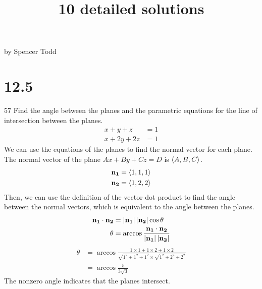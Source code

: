 \documentclass[12pt]{article}
\begin{document}
\title{10 detailed solutions}{by Spencer Todd}
\section{12.5}{57}
Find the angle between the planes and the parametric equations for the line of intersection between the planes.
%
\begin{align*}
x+y+z&=1\\
x+2y+2z&=1
\end{align*}
%
We can use the equations of the planes to find the normal vector for each plane. The normal vector of the
plane $Ax+By+Cz=D$ is $\left\langle{A,B,C}\right\rangle$.
%
\begin{align*}
\mathbf{n_1}&=\left\langle{1,1,1}\right\rangle\\
\mathbf{n_2}&=\left\langle{1,2,2}\right\rangle
\end{align*}
%
Then, we can use the definition of the vector dot product to find the angle between the normal vectors, which is equivalent
to the angle between the planes.
%
\begin{align*}
\mathbf{n_1}\cdot\mathbf{n_2}&=\left|{\mathbf{n_1}}\right|\left|{\mathbf{n_2}}\right|\cos\theta\\
\theta&=\arccos\frac{\mathbf{n_1}\cdot\mathbf{n_2}}{\left|{\mathbf{n_1}}\right|\left|{\mathbf{n_2}}\right|}
\end{align*}
\begin{align*}
\theta&=\arccos\frac{1\times1+1\times2+1\times2}{\sqrt{1^2+1^2+1^2}\times\sqrt{1^2+2^2+2^2}}\\
&=\arccos\frac{5}{3\sqrt{3}}
\end{align*}
%
The nonzero angle indicates that the planes intersect.\double
\end{document}
